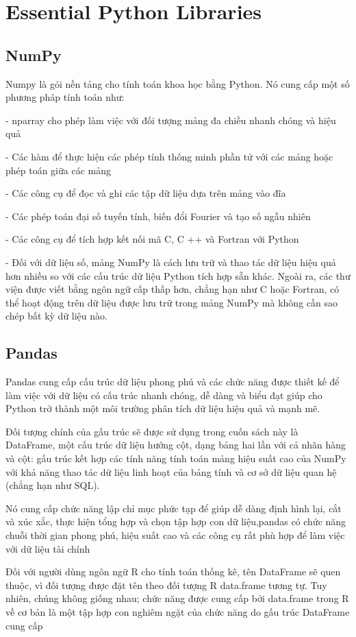 \section{Essential Python Libraries}
\subsection{NumPy}
\quad Numpy là gói nền tảng cho tính toán khoa học bằng Python. Nó cung cấp một số phương pháp tính toán như:\par
- nparray cho phép làm việc với đối tượng mảng đa chiều nhanh chóng và hiệu quả\par
- Các hàm để thực hiện các phép tính thông minh phần tử với các mảng hoặc phép toán giữa các mảng\par
- Các công cụ để đọc và ghi các tập dữ liệu dựa trên mảng vào đĩa\par
- Các phép toán đại số tuyến tính, biến đổi Fourier và tạo số ngẫu nhiên\par
- Các công cụ để tích hợp kết nối mã C, C ++ và Fortran với Python\par
- Đối với dữ liệu số, mảng NumPy là cách lưu trữ và thao tác dữ liệu hiệu quả hơn nhiều so với các cấu trúc dữ liệu Python tích hợp sẵn khác. Ngoài ra, các thư viện được viết bằng ngôn ngữ cấp thấp hơn, chẳng hạn như C hoặc Fortran, có thể hoạt động trên dữ liệu được lưu trữ trong mảng NumPy mà không cần sao chép bất kỳ dữ liệu nào.
\subsection{Pandas}
\quad Pandas cung cấp cấu trúc dữ liệu phong phú và các chức năng được thiết kế để làm việc với dữ liệu có cấu trúc nhanh chóng, dễ dàng và biểu đạt giúp cho Python trở thành một môi trường phân tích dữ liệu hiệu quả và mạnh mẽ.\par
Đối tượng chính của gấu trúc sẽ được sử dụng trong cuốn sách này là DataFrame, một cấu trúc dữ liệu hướng cột, dạng bảng hai lần với cả nhãn hàng và cột: gấu trúc kết hợp các tính năng tính toán mảng hiệu suất cao của NumPy với khả năng thao tác dữ liệu linh hoạt của bảng tính và cơ sở dữ liệu quan hệ (chẳng hạn như SQL).\par
Nó cung cấp chức năng lập chỉ mục phức tạp để giúp dễ dàng định hình lại, cắt và xúc xắc, thực hiện tổng hợp và chọn tập hợp con dữ liệu,pandas có chức năng chuỗi thời gian phong phú, hiệu suất cao và các công cụ rất phù hợp để làm việc với dữ liệu tài chính\par
Đối với người dùng ngôn ngữ R cho tính toán thống kê, tên DataFrame sẽ quen thuộc, vì đối tượng được đặt tên theo đối tượng R data.frame tương tự. Tuy nhiên, chúng không giống nhau; chức năng được cung cấp bởi data.frame trong R về cơ bản là một tập hợp con nghiêm ngặt của chức năng do gấu trúc DataFrame cung cấp
